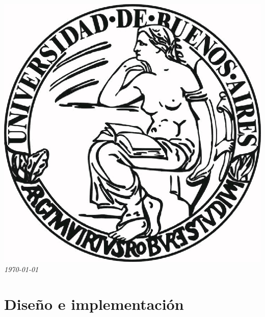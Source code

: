 \documentclass{article}
\begin{document}
\begin{titlepage}
\includegraphics[scale=0.5]{UBA.jpg}\\[1cm] %


{\large \text \em {\today}}\\[3cm] %
 

\vfill %

\end{titlepage}

	\tableofcontents
		
\newpage

\section{Diseño e implementación}
\end{document}
